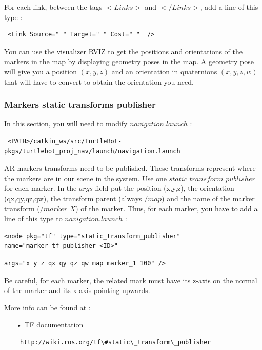 \documentclass[10pt,a4paper]{article}
\begin{document}
\newpage

For each link, between the tags $<Links>$ and $</Links>$, add a line of this type : 

\begin{verbatim} <Link Source=" " Target=" " Cost=" "  /> \end{verbatim}

You can use the visualizer RVIZ to get the positions and orientations of the markers in the map by displaying geometry poses in the map. A geometry pose will give you a position $(x,y,z)$ and an orientation in quaternions $(x,y,z,w)$ that will have to convert to obtain the orientation you need.

\subsubsection{Markers static transforms publisher}
\label{sec:markersStaticTransformsPublisher}

In this section, you will need to modify $navigation.launch$ :

\begin{verbatim} <PATH>/catkin_ws/src/TurtleBot-pkgs/turtlebot_proj_nav/launch/navigation.launch\end{verbatim}

AR markers transforms need to be published. These transforms represent where the markers are in our scene in the system. Use one $static\_transform\_publisher$ for each marker. In the $args$ field put the position (x,y,z), the orientation (qx,qy,qz,qw), the transform parent (always $/map$) and the name of the marker transform ($/marker\_X$) of the marker. Thus, for each marker, you have to add a line of this type to $navigation.launch$ :

\begin{verbatim}
<node pkg="tf" type="static_transform_publisher" name="marker_tf_publisher_<ID>" 
\end{verbatim}
\begin{verbatim}
args="x y z qx qy qz qw map marker_1 100" />
\end{verbatim}

Be careful, for each marker, the related mark must have its z-axis on the normal of the marker and its x-axis pointing upwards. 

More info can be found at :

\begin{itemize}
\item[•] \href{http://wiki.ros.org/tf\#static\_transform\_publisher}{TF documentation} 
\item[ ] \begin{verbatim} http://wiki.ros.org/tf\#static\_transform\_publisher \end{verbatim}
\end{itemize}
\end{document}
